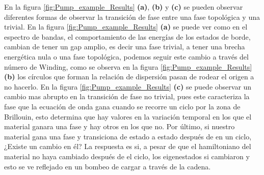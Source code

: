 En la figura \ref{fig:Pump_example_Results} \textbf{(a)}, \textbf{(b)} y \textbf{(c)} se pueden observar diferentes formas de observar la transición de fase entre una fase topológica y una trivial. En la figura \ref{fig:Pump_example_Results} \textbf{(a)} se puede ver como en el espectro de bandas, el comportamiento de las energías de los estados de borde, cambian de tener un gap amplio, es decir una fase trivial, a tener una brecha energética nula o una fase topológica, podemos seguir este cambio a través del número de Winding, como se observa en la figura \ref{fig:Pump_example_Results} \textbf{(b)} los círculos que forman la relación de dispersión pasan de rodear el origen a no hacerlo. En la figura \ref{fig:Pump_example_Results} \textbf{(c)} se puede observar un cambio mas abrupto en la transición de fase no trivial, pues este caracteriza la fase que la ecuación de onda gana cuando se recorre un ciclo por la zona de Brillouin, esto determina que hay valores en la variación temporal en los que el material ganara una fase y hay otros en los que no. Por último, si nuestro material gana una fase y transiciona de estado a estado después de en un ciclo, ¿Existe un cambio en él? La respuesta es si, a pesar de que el hamiltoniano del material no haya cambiado después de el ciclo, los eigenestados si cambiaron y esto se ve reflejado en un bombeo de cargar a través de la cadena.

